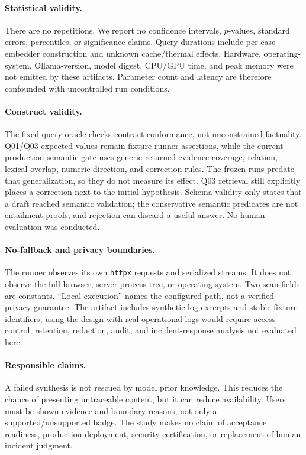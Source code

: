 \documentclass[10pt,twocolumn]{article}
\newcommand{\code}[1]{\texttt{#1}}
\begin{document}
\paragraph{Statistical validity.}
There are no repetitions.  We report no confidence intervals, $p$-values, standard errors, percentiles, or significance claims.  Query durations include per-case embedder construction and unknown cache/thermal effects.  Hardware, operating-system, Ollama-version, model digest, CPU/GPU time, and peak memory were not emitted by these artifacts.  Parameter count and latency are therefore confounded with uncontrolled run conditions.

\paragraph{Construct validity.}
The fixed query oracle checks contract conformance, not unconstrained factuality.  Q01/Q03 expected values remain fixture-runner assertions, while the current production semantic gate uses generic returned-evidence coverage, relation, lexical-overlap, numeric-direction, and correction rules.  The frozen runs predate that generalization, so they do not measure its effect.  Q03 retrieval still explicitly places a correction next to the initial hypothesis.  Schema validity only states that a draft reached semantic validation; the conservative semantic predicates are not entailment proofs, and rejection can discard a useful answer.  No human evaluation was conducted.

\paragraph{No-fallback and privacy boundaries.}
The runner observes its own \code{httpx} requests and serialized streams.  It does not observe the full browser, server process tree, or operating system.  Two scan fields are constants.  ``Local execution'' names the configured path, not a verified privacy guarantee.  The artifact includes synthetic log excerpts and stable fixture identifiers; using the design with real operational logs would require access control, retention, redaction, audit, and incident-response analysis not evaluated here.

\paragraph{Responsible claims.}
A failed synthesis is not rescued by model prior knowledge.  This reduces the chance of presenting untraceable content, but it can reduce availability.  Users must be shown evidence and boundary reasons, not only a supported/unsupported badge.  The study makes no claim of acceptance readiness, production deployment, security certification, or replacement of human incident judgment.
\end{document}
